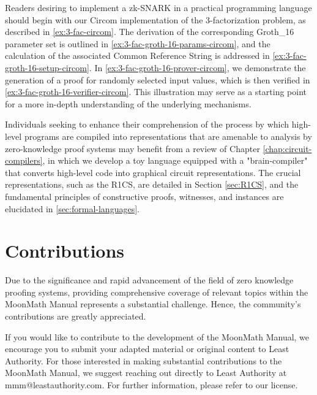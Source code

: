 Readers desiring to implement a zk-SNARK in a practical programming language should begin with our Circom implementation of the 3-factorization problem, as described in \ref{ex:3-fac-circom}. The derivation of the corresponding Groth\_16 parameter set is outlined in \ref{ex:3-fac-groth-16-params-circom}, and the calculation of the associated Common Reference String is addressed in \ref{ex:3-fac-groth-16-setup-circom}. In \ref{ex:3-fac-groth-16-prover-circom}, we demonstrate the generation of a proof for randomly selected input values, which is then verified in \ref{ex:3-fac-groth-16-verifier-circom}. This illustration may serve as a starting point for a more in-depth understanding of the underlying mechanisms.

Individuals seeking to enhance their comprehension of the process by which high-level programs are compiled into representations that are amenable to analysis by zero-knowledge proof systems may benefit from a review of Chapter \ref{chap:circuit-compilers}, in which we develop a toy language equipped with a "brain-compiler" that converts high-level code into graphical circuit representations. The crucial representations, such as the R1CS, are detailed in Section \ref{sec:R1CS}, and the fundamental principles of constructive proofs, witnesses, and instances are elucidated in \ref{sec:formal-languages}.



\section{Contributions}Due to the significance and rapid advancement of the field of zero knowledge proofing systems, providing comprehensive coverage of relevant topics within the MoonMath Manual represents a substantial challenge. Hence, the community's contributions are greatly appreciated.

If you would like to contribute to the development of the MoonMath Manual, we encourage you to submit your adapted material or original content to Least Authority. For those interested in making substantial contributions to the MoonMath Manual, we suggest reaching out directly to Least Authority at mmm@leastauthority.com. For further information, please refer to our license.


